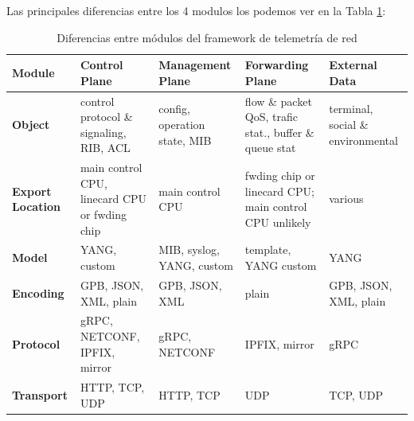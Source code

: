 Las principales diferencias entre los 4 modulos los podemos ver en la Tabla \ref{tab:diferencias_modulos_data_objects}:
\begin{table}
    \centering
    \begin{tabular}{|p{2cm}|p{3cm}|p{3cm}|p{3cm}|p{2.75cm}|}
        \hline
        \textbf{Module} & \textbf{Control Plane} &\textbf{Management Plane} & \textbf{Forwarding Plane} & \textbf{External Data} \\\hline
        
        \textbf{Object} & control protocol \& signaling, RIB, ACL & config, operation state, MIB & flow \& packet QoS, trafic stat., buffer \& queue stat & terminal, social \& environmental\\\hline
        
        \textbf{Export Location }& main control CPU, linecard CPU or fwding chip & main control CPU & fwding chip or linecard CPU; main control CPU unlikely & various \\\hline
        
        \textbf{Model} & YANG, custom & MIB, syslog, YANG, custom & template, YANG custom & YANG\\\hline
        
        \textbf{Encoding} & GPB, JSON, XML, plain & GPB, JSON, XML & plain &  GPB, JSON, XML, plain\\\hline
        
        \textbf{Protocol} & gRPC, NETCONF, IPFIX, mirror & gRPC, NETCONF& IPFIX, mirror & gRPC\\\hline
        
        \textbf{Transport} & HTTP, TCP, UDP & HTTP, TCP & UDP & TCP, UDP \\\hline
        
        
        \end{tabular}

    \caption{Diferencias entre módulos del framework de telemetría de red}
    \label{tab:diferencias_modulos_data_objects}
\end{table}






